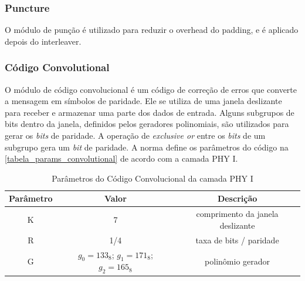 	\subsubsection{Puncture}
	
	O módulo de punção é utilizado para reduzir o overhead do padding, e é aplicado depois do interleaver.
	
	\subsubsection{Código Convolutional}
	
	O módulo de código convolucional é um código de correção de erros que converte a mensagem em símbolos de paridade. Ele se utiliza de uma janela deslizante para receber e armazenar uma parte dos dados de entrada. Alguns subgrupos de bits dentro da janela, definidos pelos geradores polinomiais, são utilizados para gerar os \textit{bits} de paridade. A operação de \textit{exclusive or} entre os \textit{bits} de um subgrupo gera um \textit{bit} de paridade. A norma define os parâmetros do código na \autoref{tabela_params_convolutional} de acordo com a camada PHY I. 
	
	\begin{table}[ht]
		\caption{Parâmetros do Código Convolucional da camada PHY I}
		\centering
		\begin{tabular}{c c c}
			\hline
			Parâmetro & Valor & Descrição \\ \hline
			K & 7 & comprimento da janela deslizante \\
			R & 1/4 & taxa de bits / paridade \\ 
			G & $g_{0} = 133_{8}$; $g_{1} = 171_{8}$; $g_{2} = 165_{8}$ & polinômio gerador \\ \hline
		\end{tabular}
		\label{tabela_params_convolutional}
	\end{table}

